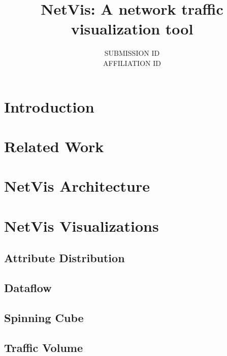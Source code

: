 \documentclass[12pt,a4paper]{article}
\title{NetVis: A network traffic visualization tool}
\author{SUBMISSION ID \\ AFFILIATION ID }
\begin{document}
\maketitle

\begin{abstract}
	
\end{abstract}

\section{Introduction}


\section{Related Work}


\section{NetVis Architecture}


\section{NetVis Visualizations}



\subsection{Attribute Distribution}


\subsection{Dataflow}


\subsection{Spinning Cube}


\subsection{Traffic Volume}

\end{document}
